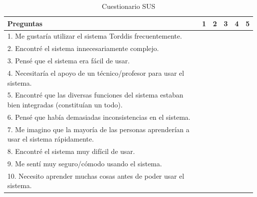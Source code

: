 \documentclass[a4paper,fleqn]{cas-sc}
\begin{document}
	\begin{table}[bt!]
		\caption{Cuestionario SUS \label{tab:SUSQuestion}}
		\centering
		\begin{tabular}{|p{10cm}|c|c|c|c|c|}
			\hline
			\textbf{Preguntas} & 1 & 2 & 3 & 4 & 5 \\
			\hline
			1. Me gustaría utilizar el sistema Torddis frecuentemente. & & & & & \\
			\hline
			2. Encontré el sistema innecesariamente complejo. & & & & & \\
			\hline
			3. Pensé que el sistema era fácil de usar. & & & & & \\
			\hline
			4. Necesitaría el apoyo de un técnico/profesor para usar el sistema. & & & & & \\
			\hline
			5. Encontré que las diversas funciones del sistema estaban bien integradas (constituían un todo). & & & & & \\
			\hline
			6. Pensé que había demasiadas inconsistencias en el sistema. & & & & & \\
			\hline
			7. Me imagino que la mayoría de las personas aprenderían a usar el sistema rápidamente. & & & & & \\
			\hline
			8. Encontré el sistema muy difícil de usar. & & & & & \\
			\hline
			9. Me sentí muy seguro/cómodo usando el sistema. & & & & & \\
			\hline
			10. Necesito aprender muchas cosas antes de poder usar el sistema. & & & & & \\
			\hline
		\end{tabular}
	\end{table}
	
\end{document}
